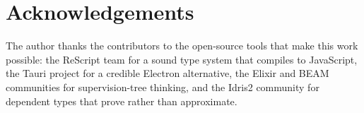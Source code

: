 \documentclass[11pt,a4paper]{article}
\begin{document}
\section*{Acknowledgements}

The author thanks the contributors to the open-source tools that
make this work possible: the ReScript team for a sound type system
that compiles to JavaScript, the Tauri project for a credible
Electron alternative, the Elixir and BEAM communities for
supervision-tree thinking, and the Idris2 community for dependent
types that prove rather than approximate.

\end{document}

